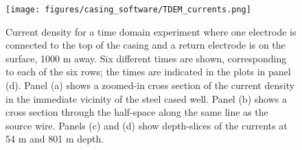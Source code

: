 \begin{figure}
    \begin{center}
    \texttt{[image: figures/casing\_software/TDEM\_currents.png]}
    \end{center}
\caption{
    Current density for a time domain experiment where one electrode is connected to the top of the casing and a return electrode is on the surface, 1000 m away.
    Six different times are shown, corresponding to each of the six rows; the times are indicated in the plots in panel (d).
    Panel (a) shows a zoomed-in cross section of the current density in the immediate vicinity of the steel cased well.
    Panel (b) shows a cross section through the half-space along the same line as the source wire.
    Panels (c) and (d) show depth-slices of the currents at 54 m and 801 m depth.
}
\label{fig:TDEM_currents}
\end{figure}
